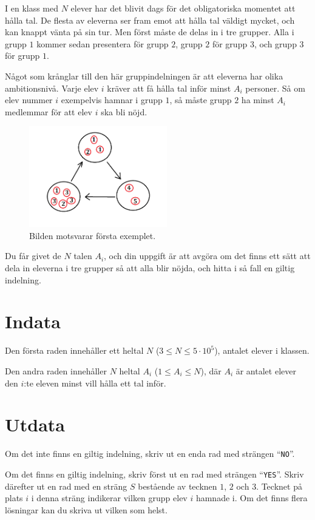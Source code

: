I en klass med $N$ elever har det blivit dags för det obligatoriska momentet att hålla tal. 
De flesta av eleverna ser fram emot att hålla tal väldigt mycket, och kan knappt vänta på sin tur.
Men först måste de delas in i tre grupper. Alla i grupp $1$ kommer sedan presentera för grupp $2$, 
grupp $2$ för grupp $3$, och grupp $3$ för grupp $1$. 

Något som krånglar till den här gruppindelningen är att eleverna har olika ambitionsnivå. Varje elev $i$
kräver att få hålla tal inför minst $A_i$ personer. Så om elev
nummer $i$ exempelvis hamnar i grupp $1$, så måste grupp $2$ ha minst $A_i$ medlemmar för att elev 
$i$ ska bli nöjd.

\begin{figure}[!h]
  \centering
  \includegraphics[width=6cm]{triangeltal.png}
  \caption{Bilden motsvarar första exemplet.}
\end{figure}

Du får givet de $N$ talen $A_i$, och din uppgift är att avgöra om det finns ett sätt att dela in eleverna
i tre grupper så att alla blir nöjda, och hitta i så fall en giltig indelning.

\section*{Indata}
Den första raden innehåller ett heltal $N$ ($3 \leq N \leq 5 \cdot 10^5$), antalet elever i klassen.

Den andra raden innehåller $N$ heltal $A_i$ ($1 \leq A_i \leq N$), där $A_i$ är antalet elever den $i$:te eleven minst vill hålla ett tal inför.

\section*{Utdata}
Om det inte finns en giltig indelning, skriv ut en enda rad med strängen ``\texttt{NO}''.

Om det finns en giltig indelning, skriv först ut en rad med strängen ``\texttt{YES}''. 
Skriv därefter ut en rad med en sträng $S$ bestående av tecknen $1$, $2$ och $3$. Tecknet på
plats $i$ i denna sträng indikerar vilken grupp elev $i$ hamnade i. Om det finns flera lösningar
kan du skriva ut vilken som helst.

